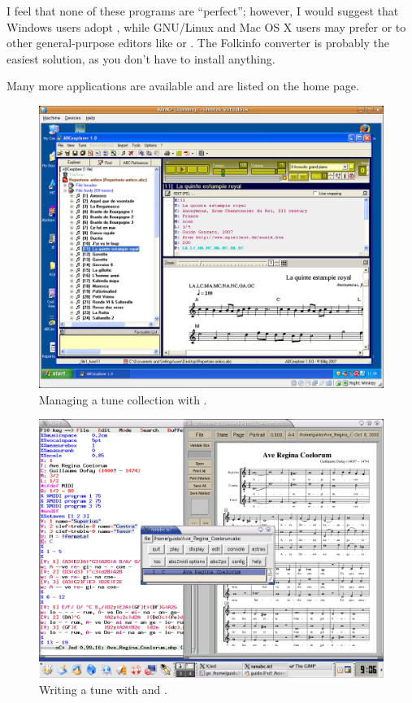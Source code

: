 \documentclass[a4paper,fullpage,12pt]{book}
\begin{document}
I feel that none of these programs are ``perfect''; however, I would
suggest that Windows users adopt \abcexplorer, while GNU/Linux and Mac
OS X users may prefer \jedabc{} or \runabc{} to other
general-purpose editors like  or . The Folkinfo
converter is probably the easiest solution, as you don't have to
install anything.

Many more applications are available and are listed on the \ABC{}
home page.

\begin{figure}[htbp]
\centering
\includegraphics[width=0.8 \linewidth]{screenshot-win.png}
\caption{Managing a tune collection with \abcexplorer.}
\label{fig:abcexplorer}
\end{figure}

\begin{figure}[htbp]
\centering
\includegraphics[width=0.8 \linewidth]{screenshot-linux.png}
\caption{Writing a tune with \jedabc{} and \runabc.}
\label{fig:jedabc}
\end{figure}
\end{document}
